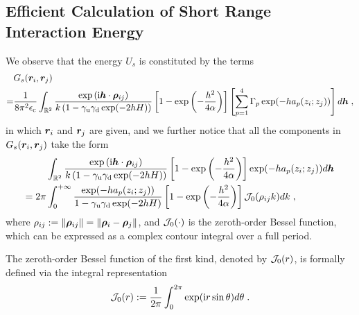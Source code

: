 \subsection{Efficient Calculation of Short Range Interaction Energy}
We observe that the energy $U_s$ is constituted  by the terms
\begin{align*}
  &G_s(\boldsymbol{r}_i, \boldsymbol{r}_j)\\
   =& \frac{1}{8\pi^2\epsilon_{\mathrm{c}}}\int_{\mathbb{R}^2} \frac{ \exp{(\mathrm{i} \boldsymbol{h} \cdot \boldsymbol{\rho}_{ij})}}{k\left(1-\gamma_{\mathrm{u}}\gamma_{\mathrm{d}}\exp(-2hH)\right)} \left[1-\exp\left(-\frac{h^2}{4\alpha}\right)\right]\left[\sum_{p=1}^4\Gamma_p\exp(-ha_p(z_i;z_j))\right]d \boldsymbol{h}\;,  
\end{align*}
in which $\bm{r}_i$ and $\bm{r}_j$ are given, and we further notice  that all the components in $G_s(\boldsymbol{r}_i, \boldsymbol{r}_j)$ take the form
\begin{align*}
   & \int_{\mathbb{R}^2} \frac{ \exp{(\mathrm{i} \boldsymbol{h} \cdot \boldsymbol{\rho}_{ij})}}{k\left(1-\gamma_{\mathrm{u}}\gamma_{\mathrm{d}}\exp(-2hH)\right)} \left[1-\exp\left(-\frac{h^2}{4\alpha}\right)\right]\exp(-ha_p(z_i;z_j))d \boldsymbol{h}\\
   =2\pi&\int_0^{+\infty} \frac{ \exp(-ha_p(z_i;z_j))}{1-\gamma_{\mathrm{u}}\gamma_{\mathrm{d}}\exp(-2hH)} \left[1-\exp\left(-\frac{h^2}{4\alpha}\right)\right]\mathcal{J}_0(\rho_{ij}k)d k\;,
\end{align*}
where $\rho_{ij}:=\left\lVert\bm{\rho}_{ij}\right\rVert=\left\lVert\bm{\rho}_i-\bm{\rho}_j\right\rVert$, and $\mathcal{J}_0(\cdot)$ is the zeroth-order Bessel function,  which  can   be expressed as a complex contour integral over a full period.
\begin{defination}
    The zeroth-order Bessel function of the first kind, denoted by $\mathcal{J}_0(r)$, is formally defined via the integral representation
\begin{equation}
      \mathcal{J}_0(r):=\frac{1}{2\pi} \int_0^{2\pi} \exp(\mathrm{i} r\sin \theta) d \theta\;.  
    \end{equation}
\end{defination}

